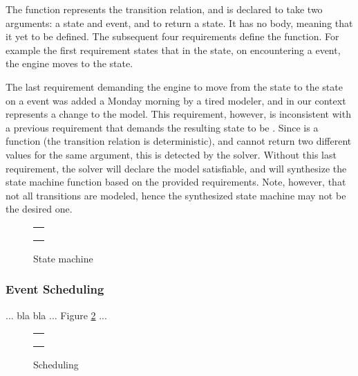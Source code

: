 The function  represents the transition relation, and 
is declared to take two arguments: a state and event, and to return a state. 
It has no body, meaning that it yet to be defined. The subsequent four  
requirements define the 
 function. For example the first requirement states that
in the  state, on encountering a  event, the engine moves 
to the  state. 

The last requirement demanding the engine to move from the  state to 
the  state on a  event was added a Monday morning by a tired
modeler, and in our context represents a change to the model.
This requirement, however, is inconsistent with a previous requirement 
that demands the resulting state to be .
Since  is a function (the transition relation is deterministic), and 
cannot return two
different values for the same argument, this is detected by the solver. 
Without this last requirement, the solver will declare the model satisfiable, and 
will synthesize the state machine function based on the provided requirements.
Note, however, that not all transitions are modeled, hence the synthesized state
machine may not be the desired one.

\begin{figure}
\centering
\begin{tabular}{c}
\hline \\
 \\ \\
\hline
\end{tabular}
\caption{State machine}
\label{fig:statemachine}
\end{figure}

\subsubsection{Event Scheduling}

... bla bla ... Figure \ref{fig:scheduling} ...

\begin{figure}
\centering
\begin{tabular}{c}
\hline \\
 \\ \\
\hline
\end{tabular}
\caption{Scheduling}
\label{fig:scheduling}
\end{figure}

